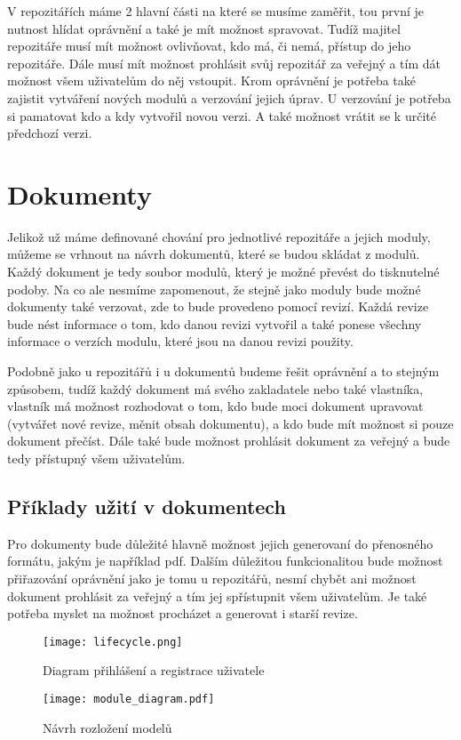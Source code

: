 V repozitářích máme 2 hlavní části na které se musíme zaměřit, tou první je nutnost hlídat oprávnění a také je mít možnost spravovat. Tudíž majitel
repozitáře musí mít možnost ovlivňovat, kdo má, či nemá, přístup do jeho repozitáře. Dále musí mít možnost prohlásit svůj repozitář za veřejný a tím
dát možnost všem uživatelům do něj vstoupit. Krom oprávnění je potřeba také zajistit vytváření nových modulů a verzování jejich úprav. U verzování je
potřeba si pamatovat kdo a kdy vytvořil novou verzi. A také možnost vrátit se k určité předchozí verzi.

\section{Dokumenty}

Jelikož už máme definované chování pro jednotlivé repozitáře a jejich moduly, můžeme se vrhnout na návrh dokumentů, které se budou skládat z modulů. Každý
dokument je tedy soubor modulů, který je možné převést do tisknutelné podoby. Na co ale nesmíme zapomenout, že stejně jako moduly bude možné dokumenty také
verzovat, zde to bude provedeno pomocí revizí. Každá revize bude nést informace o tom, kdo danou revizi vytvořil a také ponese všechny informace o verzích
modulu, které jsou na danou revizi použity.

Podobně jako u repozitářů i u dokumentů budeme řešit oprávnění a to stejným způsobem, tudíž každý dokument má svého zakladatele nebo také vlastníka,
vlastník má možnost rozhodovat o tom, kdo bude moci dokument upravovat (vytvářet nové revize, měnit obsah dokumentu), a kdo bude mít možnost si pouze dokument
přečíst. Dále také bude možnost prohlásit dokument za veřejný a bude tedy přístupný všem uživatelům.

\subsection{Příklady užití v dokumentech}

Pro dokumenty bude důležité hlavně možnost jejich generovaní do přenosného formátu, jakým je například \gls{pdf}. Dalším důležitou funkcionalitou bude možnost přiřazování
oprávnění jako je tomu u repozitářů, nesmí chybět ani možnost dokument prohlásit za veřejný a tím jej spřístupnit všem uživatelům. Je také potřeba myslet na možnost
procházet a generovat i starší revize.

\begin{figure}[h]
    \centering
    \texttt{[image: lifecycle.png]}
    \caption{Diagram přihlášení a registrace uživatele}
    \label{fig:userFlow}
\end{figure}

\begin{figure}[h]
    \centering
    \texttt{[image: module\_diagram.pdf]}
    \caption{Návrh rozložení modelů}
    \label{fig:moduleDia}
\end{figure}